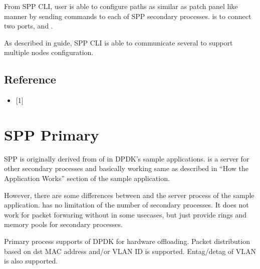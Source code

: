 \documentclass[a4paper,11pt,openany,oneside,english]{sphinxmanual}
\begin{document}
From SPP CLI, user is able to configure paths as similar as
patch panel like manner by sending commands to each of SPP secondary processes.
 is to connect two ports,  and .

As described in {\hyperref[\detokenize{gsg/howto_use:spp-setup-howto-use-spp-cli}]{}} guide,
SPP CLI is able to communicate several  to support multiple nodes
configuration.


\subsection{Reference}
\label{\detokenize{design/spp_controller:reference}}\begin{itemize}
\item {} 
{[}1{]} 

\end{itemize}


\section{SPP Primary}
\label{\detokenize{design/spp_primary:spp-primary}}\label{\detokenize{design/spp_primary:spp-overview-design-spp-primary}}\label{\detokenize{design/spp_primary::doc}}
SPP is originally derived from
of
in DPDK’s sample applications.
 is a server for other secondary processes and
basically working same as described in
“How the Application Works” section of the sample application.

However, there are some differences between  and
the server process of the sample application.
 has no limitation of the number of secondary processes.
It does not work for packet forwaring without in some usecases, but just
provide rings and memory pools for secondary processes.

Primary process supports  of DPDK for hardware offloading.
Packet distribution based on dst MAC address and/or VLAN ID
is supported. Entag/detag of VLAN is also supported.
\end{document}
